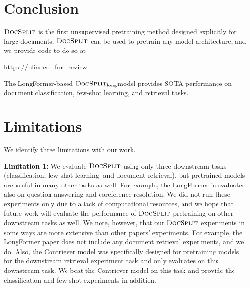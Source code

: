 \documentclass[11pt]{article}
\newcommand{\our}{\mbox{\textsc{DocSplit}}}
\newcommand{\ourlong}{$\our_{\mathrm{long}}$}
\begin{document}

\section{Conclusion}
\label{sec:conclusion}
$\our$ is the first unsupervised pretraining method designed explicitly for large documents.
$\our$ can be used to pretrain any model architecture,
and we provide code to do so at
\begin{center}
    \url{https://blinded_for_review}
\end{center}
The LongFormer-based \ourlong model provides SOTA performance on document classification, few-shot learning, and retrieval tasks.

\section*{Limitations}


We identify three limitations with our work.

\textbf{Limitation 1:}
We evaluate $\our$ using only three downstream tasks (classification, few-shot learning, and document retrieval),
but pretrained models are useful in many other tasks as well.
For example, the LongFormer \cite{Beltagy2020LongformerTL} is evaluated also on question answering and coreference resolution.
We did not run these experiments only due to a lack of computational resources,
and we hope that future work will evaluate the performance of $\our$ pretraining on other downstream tasks as well.
We note, however, that our $\our$ experiments in some ways are more extensive than other papers' experiments.
For example, the LongFormer paper does not include any document retrieval experiments, and we do.
Also, the Contriever model \citep{Izacard2021UnsupervisedDI} was specifically designed for pretraining models for the downstream retrieval experiment task and only evaluates on this downstream task.
We beat the Contriever model on this task and provide the classification and few-shot experiments in addition.
\end{document}
